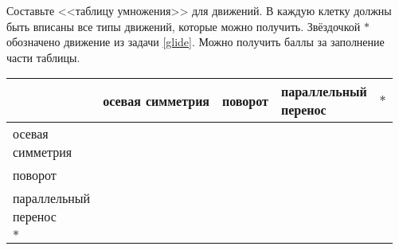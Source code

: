 \documentclass[a4paper,12pt]{article}
\begin{document}
     Составьте <<таблицу умножения>> для движений. В каждую клетку должны быть вписаны все типы движений, которые можно получить. Звёздочкой $*$ обозначено движение из задачи \ref{glide}. Можно получить баллы за заполнение части таблицы.
    \begin{center}
        \newcommand{\tab}{\phantom{ }}
        \begin{tabular}{p{}||p{}|p{}|p{}|p{}}
            \tab & осевая симметрия & поворот & \Above{параллельный\\перенос} & $*$ \\ \hline \hline
            \Above{осевая\\симметрия} & \tab & \tab & \tab & \tab \\ \hline 
            поворот &&&& \\ \hline 
            \Above{параллельный\\перенос} &&&& \\ \hline 
            $*$ &&&&
        \end{tabular}
    \end{center}
\end{document}
